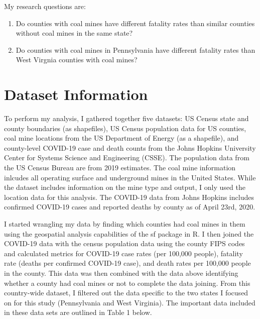 \documentclass[
  12pt,
]{article}
\begin{document}
My research questions are:

\begin{enumerate}
\def\labelenumi{\arabic{enumi}.}
\item
  Do counties with coal mines have different fatality rates than similar
  counties without coal mines in the same state?
\item
  Do counties with coal mines in Pennsylvania have different fatality
  rates than West Virgnia counties with coal mines?
\end{enumerate}

\newpage

\hypertarget{dataset-information}{%
\section{Dataset Information}\label{dataset-information}}

To perform my analysis, I gathered together five datasets: US Census
state and county boundaries (as shapefiles), US Census population data
for US counties, coal mine locations from the US Department of Energy
(as a shapefile), and county-level COVID-19 case and death counts from
the Johns Hopkins University Center for Systems Science and Engineering
(CSSE). The population data from the US Census Bureau are from 2019
estimates. The coal mine information inlcudes all operating surface and
underground mines in the United States. While the dataset includes
information on the mine type and output, I only used the location data
for this analysis. The COVID-19 data from Johns Hopkins includes
confirmed COVID-19 cases and reported deaths by county as of April 23rd,
2020.

I started wrangling my data by finding which counties had coal mines in
them using the geospatial analysis capabilities of the sf package in R.
I then joined the COVID-19 data with the census population data using
the county FIPS codes and calculated metrics for COVID-19 case rates
(per 100,000 people), fatality rate (deaths per confirmed COVID-19
case), and death rates per 100,000 people in the county. This data was
then combined with the data above identifying whether a county had coal
mines or not to complete the data joining. From this country-wide
dataset, I filtered out the data specific to the two states I focused on
for this study (Pennsylvania and West Virginia). The important data
included in these data sets are outlined in Table 1 below.
\end{document}
